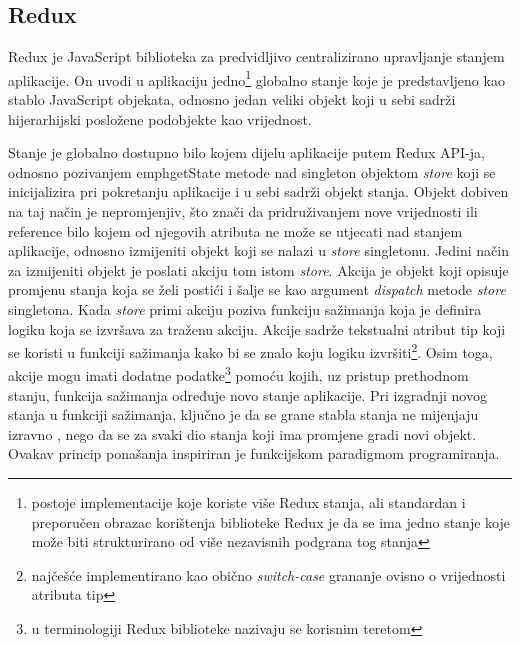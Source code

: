 \documentclass[times, utf8, diplomski, numeric]{fer}
\newcommand{\razmaks}{\vspace{10pt}}
\begin{document}
\razmaks
\subsection{Redux}

Redux je JavaScript biblioteka za predvidljivo centralizirano upravljanje stanjem aplikacije.
On uvodi u aplikaciju jedno\footnote{
    postoje implementacije koje koriste više Redux stanja, ali standardan i preporučen obrazac korištenja biblioteke Redux je da se ima jedno stanje koje može biti strukturirano od više nezavisnih podgrana tog stanja
} globalno stanje koje je predstavljeno kao stablo JavaScript objekata, odnosno jedan veliki objekt koji u sebi sadrži hijerarhijski posložene podobjekte kao vrijednost.

Stanje je globalno dostupno bilo kojem dijelu aplikacije putem Redux API-ja, odnosno pozivanjem emph{getState} metode nad singleton objektom \emph{store} koji se inicijalizira pri pokretanju aplikacije i u sebi sadrži objekt stanja. 
Objekt dobiven na taj način je nepromjenjiv, što znači da pridruživanjem nove vrijednosti ili reference bilo kojem od njegovih atributa ne može se utjecati nad stanjem aplikacije, odnosno izmijeniti objekt koji se nalazi u \emph{store} singletonu.
Jedini način za izmijeniti objekt je poslati  akciju tom istom \emph{store}.
Akcija  je objekt koji opisuje promjenu stanja koja se želi postići i šalje se kao argument \emph{dispatch} metode \emph{store} singletona.
Kada \emph{store} primi akciju poziva funkciju sažimanja  koja je definira logiku koja se izvršava za traženu akciju.
Akcije sadrže tekstualni atribut tip  koji se koristi u funkciji sažimanja kako bi se znalo koju logiku izvršiti\footnote{
    najčešće implementirano kao obično \emph{switch-case} grananje ovisno o vrijednosti atributa tip
}.
Osim toga, akcije mogu imati dodatne podatke\footnote{
    u terminologiji Redux biblioteke nazivaju se korisnim teretom 
} pomoću kojih, uz pristup prethodnom stanju, funkcija sažimanja određuje novo stanje aplikacije.
Pri izgradnji novog stanja u funkciji sažimanja, ključno je da se grane stabla stanja ne mijenjaju izravno , nego da se za svaki dio stanja koji ima promjene gradi novi objekt.
Ovakav princip ponašanja inspiriran je funkcijskom paradigmom programiranja\citep{redux}.
\end{document}
